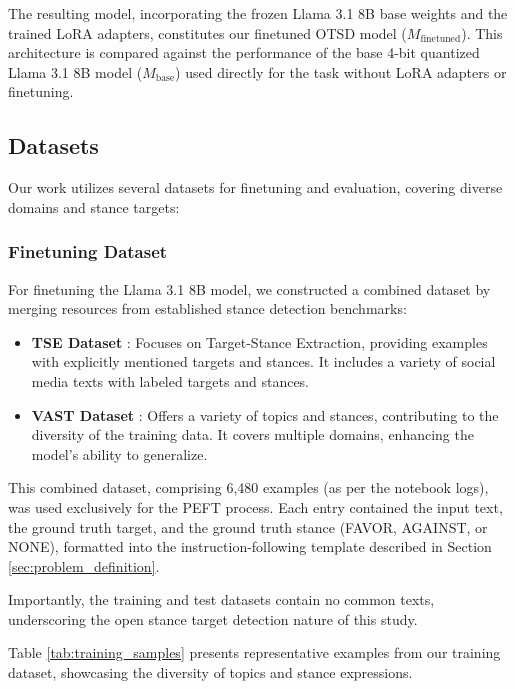 \documentclass[twocolumn,11pt,letterpaper]{article}
\begin{document}
The resulting model, incorporating the frozen Llama 3.1 8B base weights and the trained LoRA adapters, constitutes our finetuned OTSD model ($M_{\text{finetuned}}$). This architecture is compared against the performance of the base 4-bit quantized Llama 3.1 8B model ($M_{\text{base}}$) used directly for the task without LoRA adapters or finetuning.

\subsection{Datasets}
\label{sec:dataset}

Our work utilizes several datasets for finetuning and evaluation, covering diverse domains and stance targets:

\subsubsection{Finetuning Dataset}
For finetuning the Llama 3.1 8B model, we constructed a combined dataset by merging resources from established stance detection benchmarks:
\begin{itemize}
    \item \textbf{TSE Dataset} \cite{tse_data}: Focuses on Target-Stance Extraction, providing examples with explicitly mentioned targets and stances. It includes a variety of social media texts with labeled targets and stances.
    \item \textbf{VAST Dataset} \cite{vast_data}: Offers a variety of topics and stances, contributing to the diversity of the training data. It covers multiple domains, enhancing the model's ability to generalize.
\end{itemize}
This combined dataset, comprising 6,480 examples (as per the notebook logs), was used exclusively for the PEFT process. Each entry contained the input text, the ground truth target, and the ground truth stance (FAVOR, AGAINST, or NONE), formatted into the instruction-following template described in Section \ref{sec:problem_definition}.

Importantly, the training and test datasets contain no common texts, underscoring the open stance target detection nature of this study.

Table \ref{tab:training_samples} presents representative examples from our training dataset, showcasing the diversity of topics and stance expressions.
\end{document}
